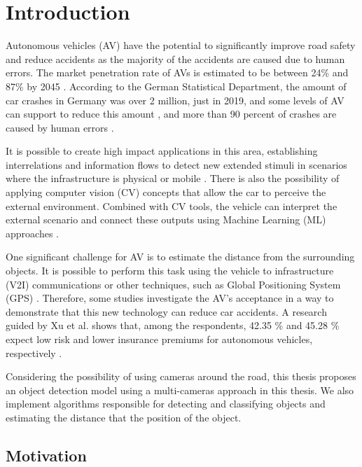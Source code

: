 \chapter{Introduction} \label{introducao}


Autonomous vehicles (AV) have the potential to significantly improve road safety and reduce accidents as the majority of the accidents are caused due to human errors. The market penetration rate of AVs is estimated to be between 24\% and 87\% by 2045 \cite{bansal2017forecasting}. According to the German Statistical Department, the amount of car crashes in Germany was over 2 million, just in 2019, and some levels of AV can support to reduce this amount \cite{deutsch}, and 
more than 90 percent of crashes are caused by human errors \cite{car-crash}. 


It is possible to create high impact applications in this area, establishing interrelations and information flows to detect new extended stimuli in scenarios where the infrastructure is physical or mobile \cite{bayat2017environmental}. There is also the possibility of applying computer vision (CV) concepts that allow the car to perceive the external environment. Combined with CV tools, the vehicle can interpret the external scenario and connect these outputs using Machine Learning (ML) approaches \cite{rasouli2019autonomous}.

One significant challenge for AV is to estimate the distance from the surrounding objects. It is possible to perform this task using the vehicle to infrastructure (V2I) communications or other techniques, such as Global Positioning System (GPS) \cite{hobert2015enhancements}. Therefore, some studies investigate the AV's acceptance in a way to demonstrate that this new technology can reduce car accidents. A research guided by Xu et al. shows that, among the respondents, 42.35 \% and 45.28 \% expect low risk and lower insurance premiums for autonomous vehicles, respectively \cite{xu2019autonomous}.

Considering the possibility of using cameras around the road, this thesis proposes an object detection model using a multi-cameras approach in this thesis. We also implement algorithms responsible for detecting and classifying objects and estimating the distance that the position of the object.

\section{Motivation}

